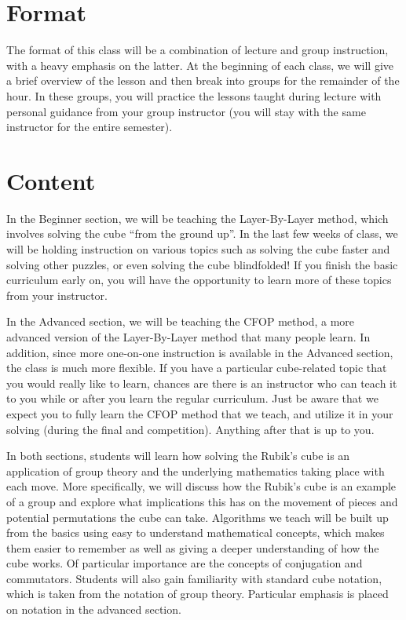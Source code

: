 \documentclass[11pt]{article}
\begin{document}
\section*{Format}
The format of this class will be a combination of lecture and group instruction, with a heavy emphasis on the latter. At the beginning of each class, we will give a brief overview of the lesson and then break into groups for the remainder of the hour. In these groups, you will practice the lessons taught during lecture with personal guidance from your group instructor (you will stay with the same instructor for the entire semester).

\section*{Content}
In the Beginner section, we will be teaching the Layer-By-Layer method, which involves solving the cube “from the ground up”. In the last few weeks of class, we will be holding instruction on various topics such as solving the cube faster and solving other puzzles, or even solving the cube blindfolded! If you finish the basic curriculum early on, you will have the opportunity to learn more of these topics from your instructor.

In the Advanced section, we will be teaching the CFOP method, a more advanced version of the Layer-By-Layer method that many people learn. In addition, since more one-on-one instruction is available in the Advanced section, the class is much more flexible. If you have a particular cube-related topic that you would really like to learn, chances are there is an instructor who can teach it to you while or after you learn the regular curriculum. Just be aware that we expect you to fully learn the CFOP method that we teach, and utilize it in your solving (during the final and competition). Anything after that is up to you.

In both sections, students will learn how solving the Rubik's cube is an application of group theory and the underlying mathematics taking place with each move. More specifically, we will discuss how the Rubik's cube is an example of a group and explore what implications this has on the movement of pieces and potential permutations the cube can take. Algorithms we teach will be built up from the basics using easy to understand mathematical concepts, which makes them easier to remember as well as giving a deeper understanding of how the cube works. Of particular importance are the concepts of conjugation and commutators. Students will also gain familiarity with standard cube notation, which is taken from the notation of group theory. Particular emphasis is placed on notation in the advanced section.
\end{document}

